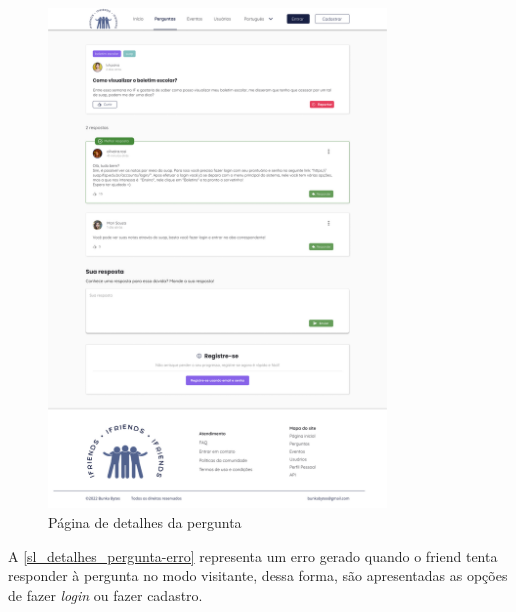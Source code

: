 \begin{figure}[htb]
\centering
\caption{\label{sl_detalhes_pergunta} Página de detalhes da pergunta}
\includegraphics[width=0.8\textwidth]{anexos/Imagens_Prototipo/sem_login/pergunta_respostas.png}
\end{figure}
\FloatBarrier

A \autoref{sl_detalhes_pergunta-erro} representa um erro gerado quando o \gls{friend} tenta responder à pergunta no modo visitante, dessa forma, são apresentadas as opções de fazer \textit{login} ou fazer cadastro. 

